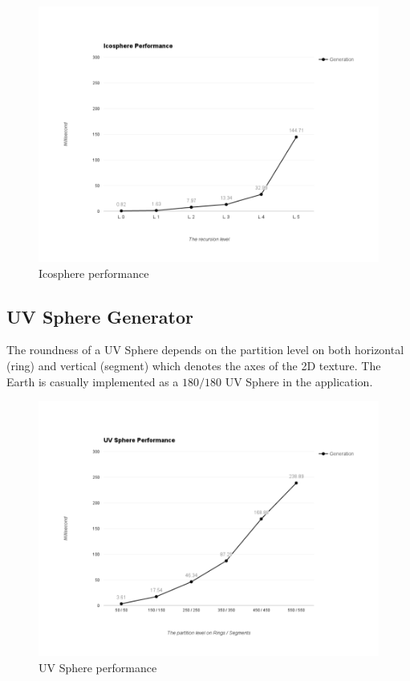 \begin{figure}[H]
	\caption{Icosphere performance}
	\label{fig:icosphere-performance}
	\centering
	\includegraphics[width=\textwidth, keepaspectratio]{Figures/icosphere-performance.png}
	\decoRule
\end{figure}

\subsection{UV Sphere Generator}

The roundness of a UV Sphere depends on the partition level on both horizontal (ring) and vertical (segment) which denotes the axes of the 2D texture. The Earth is casually implemented as a $180 / 180$ UV Sphere in the application.

\begin{figure}[H]
	\caption{UV Sphere performance}
	\label{fig:uv-sphere-performance}
	\centering
	\includegraphics[width=\textwidth, keepaspectratio]{Figures/uv-sphere-performance.png}
	\decoRule
\end{figure}

